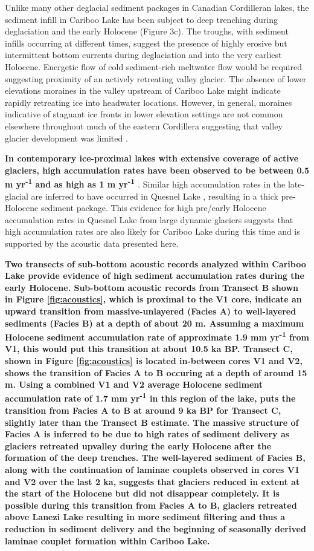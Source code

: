 \documentclass[Royal,times,doublespace,sageh]{sagej}
\begin{document}
Unlike many other deglacial sediment packages in Canadian Cordilleran
lakes, the sediment infill in Cariboo Lake has been subject to deep
trenching during deglaciation and the early Holocene (Figure 3c). The
troughs, with sediment infills occurring at different times, suggest the
presence of highly erosive but intermittent bottom currents during
deglaciation and into the very earliest Holocene. Energetic flow of cold
sediment-rich meltwater flow would be required suggesting proximity of
an actively retreating valley glacier. The absence of lower elevations
moraines in the valley upstream of Cariboo Lake might indicate rapidly
retreating ice into headwater locations. However, in general, moraines
indicative of stagnant ice fronts in lower elevation settings are not
common elsewhere throughout much of the eastern Cordillera suggesting
that valley glacier development was limited \citep{Menounos2009b}.

\textbf{In contemporary ice-proximal lakes with extensive coverage of
active glaciers, high accumulation rates have been observed to be
between 0.5 m yr\textsuperscript{-1} \citep{Crookshanks2008} and as high
as 1 m yr\textsuperscript{-1} \citep{Gilbert1997}}. Similar high
accumulation rates in the late-glacial are inferred to have occurred in
Quesnel Lake \citep{Gilbert2012}, resulting in a thick pre-Holocene
sediment package. This evidence for high pre/early Holocene accumulation
rates in Quesnel Lake from large dynamic glaciers suggests that high
accumulation rates are also likely for Cariboo Lake during this time and
is supported by the acoustic data presented here.

\textbf{Two transects of sub-bottom acoustic records analyzed within
Cariboo Lake provide evidence of high sediment accumulation rates during
the early Holocene. Sub-bottom acoustic records from Transect B shown in
Figure \ref{fig:acoustics}, which is proximal to the V1 core, indicate
an upward transition from massive-unlayered (Facies A) to well-layered
sediments (Facies B) at a depth of about 20 m. Assuming a maximum
Holocene sediment accumulation rate of approximate 1.9 mm
yr\textsuperscript{-1} from V1, this would put this transition at about
10.5 ka BP. Transect C, shown in Figure \ref{fig:acoustics} is located
in-between cores V1 and V2, shows the transition of Facies A to B
occuring at a depth of around 15 m. Using a combined V1 and V2 average
Holocene sediment accumulation rate of 1.7 mm yr\textsuperscript{-1} in
this region of the lake, puts the transition from Facies A to B at
around 9 ka BP for Transect C, slightly later than the Transect B
estimate. The massive structure of Facies A is inferred to be due to
high rates of sediment delivery as glaciers retreated upvalley during
the early Holocene after the formation of the deep trenches. The
well-layered sediment of Facies B, along with the continuation of
laminae couplets observed in cores V1 and V2 over the last 2 ka,
suggests that glaciers reduced in extent at the start of the Holocene
but did not disappear completely. It is possible during this transition
from Facies A to B, glaciers retreated above Lanezi Lake resulting in
more sediment filtering and thus a reduction in sediment delivery and
the beginning of seasonally derived laminae couplet formation within
Cariboo Lake.}
\end{document}
